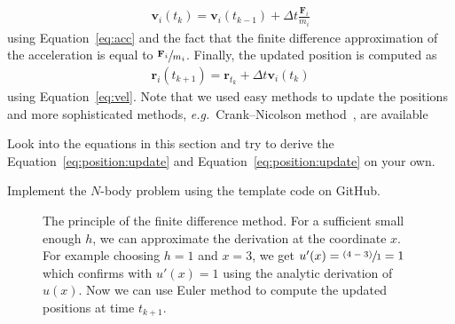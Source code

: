 \documentclass[11pt,fleqn]{book} %
\begin{document}
\begin{align}
\mathbf{v}_i(t_k) = \mathbf{v}_i(t_{k-1}) + \Delta t \frac{\mathbf{F}_i}{m_i} \label{eq:position:update}
\end{align}
using Equation~\eqref{eq:acc} and the fact that the finite difference approximation of the acceleration is equal to $\sfrac{\mathbf{F}_i}{m_i}$. Finally, the updated position is computed as
\begin{align}
\mathbf{r}_i(t_{k+1}) = \mathbf{r}_{t_k} + \Delta t \mathbf{v}_i(t_k)  \label{eq:position:update}
\end{align} 
using Equation~\eqref{eq:vel}. Note that we used easy methods to update the positions and more sophisticated methods, \emph{e.g.}\ Crank--Nicolson method~\cite{crank1947practical}, are available

\begin{exercise}
Look into the equations in this section and try to derive the Equation~\ref{eq:position:update} and Equation~\ref{eq:position:update} on your own.
\end{exercise}

\begin{exercise}
Implement the $N$-body problem using the template code on GitHub.
\end{exercise}

\begin{figure}[tb]
\centering
{}
\caption{The principle of the finite difference method. For a sufficient small enough $h$, we can approximate the derivation at the coordinate $x$. For example choosing $h=1$ and $x=3$, we get $u'(x)=\sfrac{(4-3)}{1}=1$ which confirms with $u'(x)=1$ using the analytic derivation of $u(x)$. Now we can use Euler method to compute the updated positions at time $t_{k+1}$.}
\label{fig:nbody:finitedifference}
\end{figure}
\end{document}
